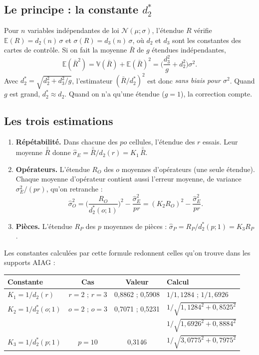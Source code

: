 \documentclass[11pt,a4paper]{article}
\theoremstyle{sj}
\theoremstyle{definition}
\theoremstyle{remark}
\newcommand{\E}{\mathbb{E}}
\newcommand{\V}{\mathbb{V}}
\newcommand{\N}{\mathcal{N}}
\begin{document}
\subsection{Le principe : la constante $d_2^*$}

Pour $n$ variables indépendantes de loi $\N(\mu;\sigma)$, l'étendue $R$ vérifie $\E(R)=d_2(n)\,\sigma$ et $\sigma(R)=d_3(n)\,\sigma$, où $d_2$ et $d_3$ sont les constantes des cartes de contrôle. Si on fait la moyenne $\bar R$ de $g$ étendues indépendantes,
\[
\E(\bar R^2)=\V(\bar R)+\E(\bar R)^2=\Big(\frac{d_3^2}{g}+d_2^2\Big)\sigma^2.
\]
Avec $d_2^*=\sqrt{d_2^2+d_3^2/g}$, l'estimateur $(\bar R/d_2^*)^2$ est donc \emph{sans biais pour $\sigma^2$}. Quand $g$ est grand, $d_2^*\approx d_2$. Quand on n'a qu'une étendue ($g=1$), la correction compte.

\subsection{Les trois estimations}

\begin{enumerate}[leftmargin=1.4em]
\item \textbf{Répétabilité.} Dans chacune des $po$ cellules, l'étendue des $r$ essais. Leur moyenne $\bar{\bar R}$ donne $\hat\sigma_E=\bar{\bar R}/d_2(r)=K_1\,\bar{\bar R}$.
\item \textbf{Opérateurs.} L'étendue $R_O$ des $o$ moyennes d'opérateurs (une seule étendue). Chaque moyenne d'opérateur contient aussi l'erreur moyenne, de variance $\sigma_E^2/(pr)$, qu'on retranche :
\[
\hat\sigma_O^2=\Big(\frac{R_O}{d_2^*(o;1)}\Big)^2-\frac{\hat\sigma_E^2}{pr}=(K_2R_O)^2-\frac{\hat\sigma_E^2}{pr}.
\]
\item \textbf{Pièces.} L'étendue $R_P$ des $p$ moyennes de pièces : $\hat\sigma_P=R_P/d_2^*(p;1)=K_3R_P$.
\end{enumerate}

Les constantes calculées par cette formule redonnent celles qu'on trouve dans les supports AIAG :
\begin{center}
\small
\begin{tabular}{l c c l}
\toprule
Constante & Cas & Valeur & Calcul\\
\midrule
$K_1=1/d_2(r)$ & $r=2$ ; $r=3$ & 0,8862 ; 0,5908 & $1/1{,}1284$ ; $1/1{,}6926$\\
$K_2=1/d_2^*(o;1)$ & $o=2$ ; $o=3$ & 0,7071 ; 0,5231 & $1/\sqrt{1{,}1284^2+0{,}8525^2}$\\ & & & $1/\sqrt{1{,}6926^2+0{,}8884^2}$\\
$K_3=1/d_2^*(p;1)$ & $p=10$ & 0,3146 & $1/\sqrt{3{,}0775^2+0{,}7975^2}$\\
\bottomrule
\end{tabular}
\end{center}
\end{document}
